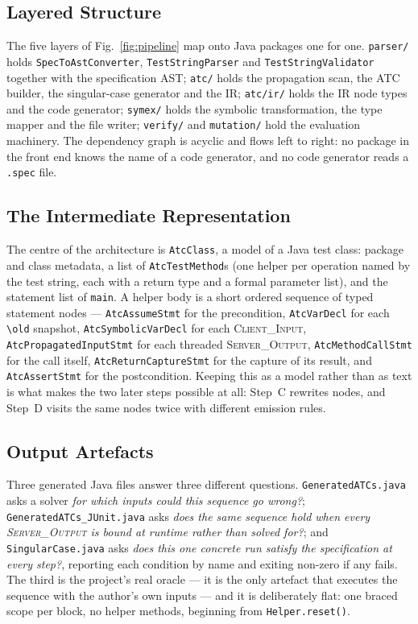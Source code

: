 \documentclass[conference]{IEEEtran}
\begin{document}
\subsection{Layered Structure}

The five layers of Fig.~\ref{fig:pipeline} map onto Java packages one for one.
\texttt{parser/} holds \texttt{SpecToAstConverter},
\texttt{TestStringParser} and \texttt{TestStringValidator} together with the
specification AST; \texttt{atc/} holds the propagation scan, the ATC builder, the
singular-case generator and the IR; \texttt{atc/ir/} holds the IR node types and
the code generator; \texttt{symex/} holds the symbolic transformation, the type
mapper and the file writer; \texttt{verify/} and \texttt{mutation/} hold the
evaluation machinery. The dependency graph is acyclic and flows left to right: no
package in the front end knows the name of a code generator, and no code generator
reads a \texttt{.spec} file.

\subsection{The Intermediate Representation}

The centre of the architecture is \texttt{AtcClass}, a model of a Java test class:
package and class metadata, a list of \texttt{AtcTestMethod}s (one helper per
operation named by the test string, each with a return type and a formal parameter
list), and the statement list of \texttt{main}. A helper body is a short ordered
sequence of typed statement nodes ---
\texttt{AtcAssumeStmt} for the precondition,
\texttt{AtcVarDecl} for each \texttt{\textbackslash old} snapshot,
\texttt{AtcSymbolicVarDecl} for each \textsc{Client\_Input},
\texttt{AtcPropagatedInputStmt} for each threaded \textsc{Server\_Output},
\texttt{AtcMethodCallStmt} for the call itself,
\texttt{AtcReturnCaptureStmt} for the capture of its result, and
\texttt{AtcAssertStmt} for the postcondition.
Keeping this as a model rather than as text is what makes the two later steps
possible at all: Step~C rewrites nodes, and Step~D visits the same nodes twice with
different emission rules.

\subsection{Output Artefacts}

Three generated Java files answer three different questions.
\texttt{GeneratedATCs.java} asks a solver \emph{for which inputs could this sequence
go wrong?}; \texttt{GeneratedATCs\_JUnit.java} asks \emph{does the same sequence hold
when every \textsc{Server\_Output} is bound at runtime rather than solved for?}; and
\texttt{SingularCase.java} asks \emph{does this one concrete run satisfy the
specification at every step?}, reporting each condition by name and exiting non-zero
if any fails. The third is the project's real oracle --- it is the only artefact that
executes the sequence with the author's own inputs --- and it is deliberately flat:
one braced scope per block, no helper methods, beginning from \texttt{Helper.reset()}.
\end{document}
